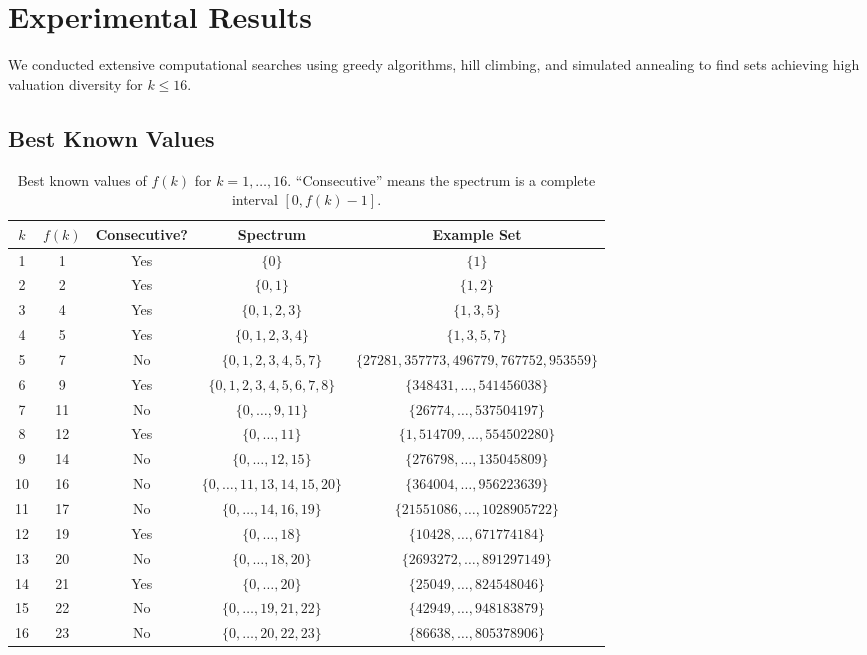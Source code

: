 \documentclass[11pt]{article}
\begin{document}
\section{Experimental Results}

We conducted extensive computational searches using greedy algorithms, hill climbing, and simulated annealing to find sets achieving high valuation diversity for $k \le 16$.

\subsection{Best Known Values}

\begin{table}[ht]
\centering
\begin{tabular}{c|c|c|c|c}
\toprule
$k$ & $f(k)$ & Consecutive? & Spectrum & Example Set \\
\midrule
1 & 1 & Yes & $\{0\}$ & $\{1\}$ \\
2 & 2 & Yes & $\{0,1\}$ & $\{1,2\}$ \\
3 & 4 & Yes & $\{0,1,2,3\}$ & $\{1,3,5\}$ \\
4 & 5 & Yes & $\{0,1,2,3,4\}$ & $\{1,3,5,7\}$ \\
5 & 7 & No & $\{0,1,2,3,4,5,7\}$ & $\{27281, 357773, 496779, 767752, 953559\}$ \\
6 & 9 & Yes & $\{0,1,2,3,4,5,6,7,8\}$ & $\{348431, \dots, 541456038\}$ \\
7 & 11 & No & $\{0,\dots,9,11\}$ & $\{26774, \dots, 537504197\}$ \\
8 & 12 & Yes & $\{0,\dots,11\}$ & $\{1, 514709, \dots, 554502280\}$ \\
9 & 14 & No & $\{0,\dots,12,15\}$ & $\{276798, \dots, 135045809\}$ \\
10 & 16 & No & $\{0,\dots,11,13,14,15,20\}$ & $\{364004, \dots, 956223639\}$ \\
11 & 17 & No & $\{0,\dots,14,16,19\}$ & $\{21551086, \dots, 1028905722\}$ \\
12 & 19 & Yes & $\{0,\dots,18\}$ & $\{10428, \dots, 671774184\}$ \\
13 & 20 & No & $\{0,\dots,18,20\}$ & $\{2693272, \dots, 891297149\}$ \\
14 & 21 & Yes & $\{0,\dots,20\}$ & $\{25049, \dots, 824548046\}$ \\
15 & 22 & No & $\{0,\dots,19,21,22\}$ & $\{42949, \dots, 948183879\}$ \\
16 & 23 & No & $\{0,\dots,20,22,23\}$ & $\{86638, \dots, 805378906\}$ \\
\bottomrule
\end{tabular}
\caption{Best known values of $f(k)$ for $k=1,\dots,16$. ``Consecutive'' means the spectrum is a complete interval $[0, f(k)-1]$.}
\label{tab:best}
\end{table}
\end{document}
